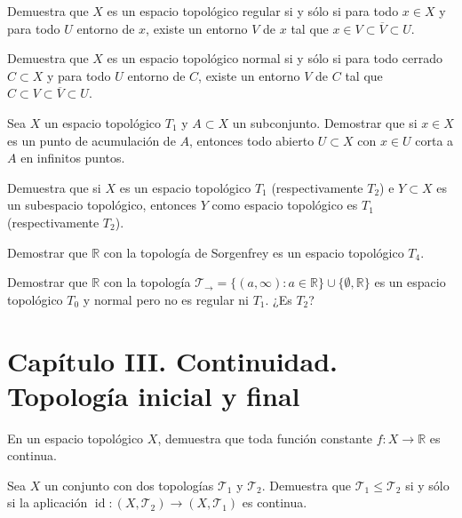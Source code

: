 \begin{ejer}[79]
Demuestra que $X$ es un espacio topológico regular si y sólo si para todo $x \in X$ y para todo $U$ entorno de $x$, existe un entorno $V$ de $x$ tal que $x \in V \subset \overline{V} \subset U$.
\end{ejer}

\begin{ejer}[80]
Demuestra que $X$ es un espacio topológico normal si y sólo si para todo cerrado $C \subset X$ y para todo $U$ entorno de $C$, existe un entorno $V$ de $C$ tal que $C \subset V \subset \overline{V} \subset U$.
\end{ejer}

\begin{ejer}[81]
Sea $X$ un espacio topológico $T_1$ y $A \subset X$ un subconjunto. Demostrar que si $x \in X$ es un punto de acumulación de $A$, entonces todo abierto $U \subset X$ con $x \in U$ corta a $A$ en infinitos puntos.
\end{ejer}

\begin{ejer}[82]
Demuestra que si $X$ es un espacio topológico $T_1$ (respectivamente $T_2$) e $Y \subset X$ es un subespacio topológico, entonces $Y$ como espacio topológico es $T_1$ (respectivamente $T_2$).
\end{ejer}

\begin{ejer}[83]
Demostrar que $\mathbb{R}$ con la topología de Sorgenfrey es un espacio topológico $T_4$.
\end{ejer}

\begin{ejer}[84]
Demostrar que $\mathbb{R}$ con la topología $\mathcal{T}_\rightarrow = \{(a, \infty) : a \in \mathbb{R}\} \cup \{\emptyset, \mathbb{R}\}$ es un espacio topológico $T_0$ y normal pero no es regular ni $T_1$. ¿Es $T_2$?
\end{ejer}

\section*{Capítulo III. Continuidad. Topología inicial y final}

\begin{ejer}[85]
En un espacio topológico $X$, demuestra que toda función constante $f \colon X \to \mathbb{R}$ es continua.
\end{ejer}

\begin{ejer}[86]
Sea $X$ un conjunto con dos topologías $\mathcal{T}_1$ y $\mathcal{T}_2$. Demuestra que $\mathcal{T}_1 \le \mathcal{T}_2$ si y sólo si la aplicación $\operatorname{id} \colon (X, \mathcal{T}_2) \to (X, \mathcal{T}_1)$ es continua.
\end{ejer}

